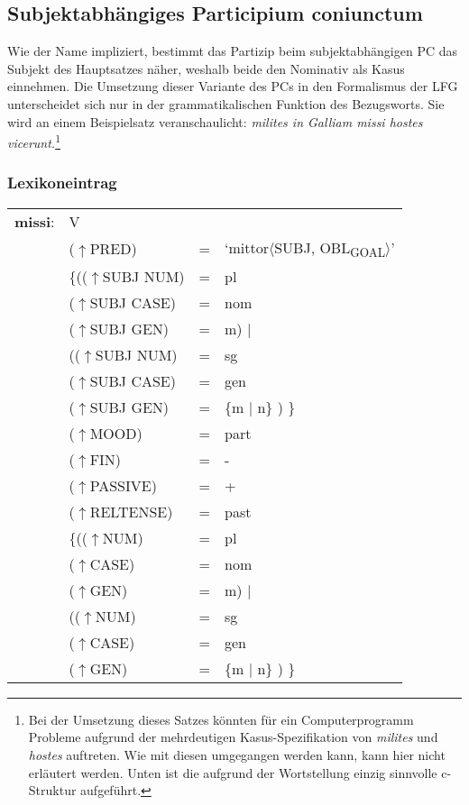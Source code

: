 \documentclass[12pt,a4paper]{article}
\begin{document}
\subsection{Subjektabhängiges Participium coniunctum}
Wie der Name impliziert, bestimmt das Partizip beim subjektabhängigen PC das Subjekt des Hauptsatzes näher, weshalb beide den Nominativ als Kasus einnehmen. Die Umsetzung dieser Variante des PCs in den Formalismus der LFG unterscheidet sich nur in der grammatikalischen Funktion des Bezugsworts. Sie wird an einem Beispielsatz veranschaulicht:
\textit{milites in Galliam missi hostes vicerunt.}\footnote{Bei der Umsetzung dieses Satzes könnten für ein Computerprogramm Probleme aufgrund der mehrdeutigen Kasus-Spezifikation von \textit{milites} und \textit{hostes} auftreten. Wie mit diesen umgegangen werden kann, kann hier nicht erläutert werden. Unten ist die aufgrund der Wortstellung einzig sinnvolle c-Struktur aufgeführt.}

\subsubsection{Lexikoneintrag}
\begin{singlespace}
\begin{tabular}{ l  l  l  l  } 
\textbf{missi}: & \: V \\
$\qquad$ & \:  ($\uparrow$PRED) & = & `mittor$\langle$SUBJ, OBL\textsubscript{GOAL}$\rangle$'\\
$\qquad$ & \:  \{(($\uparrow$SUBJ NUM) & = & pl \\ 
$\qquad$ & \: \: \: ($\uparrow$SUBJ CASE) & = & nom \\
$\qquad$ & \: \: \: ($\uparrow$SUBJ GEN) & = & m) $\mid$\\
$\qquad$ & \: \: (($\uparrow$SUBJ NUM) & = & sg \\ 
$\qquad$ & \: \: \: ($\uparrow$SUBJ CASE) & = & gen \\
$\qquad$ & \: \: \: ($\uparrow$SUBJ GEN) & = & \{m $\mid$ n\} ) \} \\
$\qquad$ & \:  ($\uparrow$MOOD) & = & part \\
$\qquad$ & \:  ($\uparrow$FIN) & = & - \\
$\qquad$ & \:  ($\uparrow$PASSIVE) & = & + \\
$\qquad$ & \: ($\uparrow$RELTENSE) & = & past \\
$\qquad$ & \:  \{(($\uparrow$NUM) & = & pl \\ 
$\qquad$ & \: \: \: ($\uparrow$CASE) & = & nom \\
$\qquad$ & \: \: \: ($\uparrow$GEN) & = & m) $\mid$\\
$\qquad$ & \: \: (($\uparrow$NUM) & = & sg \\ 
$\qquad$ & \: \: \: ($\uparrow$CASE) & = & gen \\
$\qquad$ & \: \: \: ($\uparrow$GEN) & = & \{m $\mid$ n\} ) \} \\
\end{tabular}
\newline
\newline
\newline
\end{singlespace}
\end{document}
